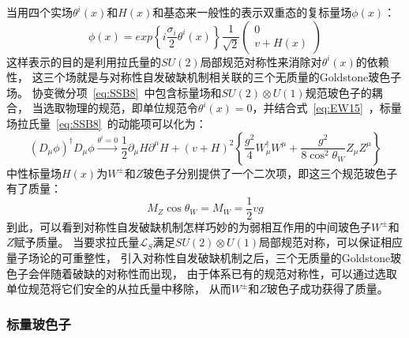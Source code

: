 当用四个实场$\theta^i(x)$和$H(x)$和基态来一般性的表示双重态的复标量场$\phi(x)$：
\begin{equation} 
\label{eq:SSB11}
\phi(x)=exp\left\{  i \frac{\sigma_i}{2}\theta^i(x)  \right\} \frac{1}{\sqrt{2}}
\left( \begin{array}{l} 0 \\  v+H(x) \end{array} \right)
\end{equation}
这样表示的目的是利用拉氏量的$SU(2)$局部规范对称性来消除对$\theta^i(x)$的依赖性，
这三个场就是与对称性自发破缺机制相关联的三个无质量的Goldstone玻色子场。
协变微分项~\ref{eq:SSB8}~中包含标量场和$SU(2)\otimes U(1)$规范玻色子的耦合，
当选取物理的规范，即单位规范令$\theta^i(x)=0$，并结合式~\ref{eq:EW15}~，标量场拉氏量~\ref{eq:SSB8}~的动能项可以化为：
\begin{equation} 
\label{eq:SSB12}
(D_{\mu}\phi)^{\dagger}D_{\mu}\phi \xrightarrow{\theta^i=0} \frac{1}{2} \partial_{\mu}H \partial^{\mu}H
+(v+H)^2\left\{    \frac{g^2}{4}W^{\dagger}_{\mu}W^{\mu} +\frac{g^2}{8\cos^2 \theta_W}Z_{\mu}Z^{\mu}    \right\}
\end{equation}
中性标量场$H(x)$为$W^{\pm}$和$Z$玻色子分别提供了一个二次项，即这三个规范玻色子有了质量：
\begin{equation} 
\label{eq:SSB13}
M_Z \cos \theta_W=M_W=\frac{1}{2}vg
\end{equation}
到此，可以看到对称性自发破缺机制怎样巧妙的为弱相互作用的中间玻色子$W^{\pm}$和$Z$赋予质量。
当要求拉氏量$\mathcal{L}_S$满足$SU(2)\otimes U(1)$局部规范对称，可以保证相应量子场论的可重整性，
引入对称性自发破缺机制之后，三个无质量的Goldstone玻色子会伴随着破缺的对称性而出现，
由于体系已有的规范对称性，可以通过选取单位规范将它们安全的从拉氏量中移除，
从而$W^{\pm}$和$Z$玻色子成功获得了质量。

\subsubsection{标量玻色子}
\label{sec:SSBH}

